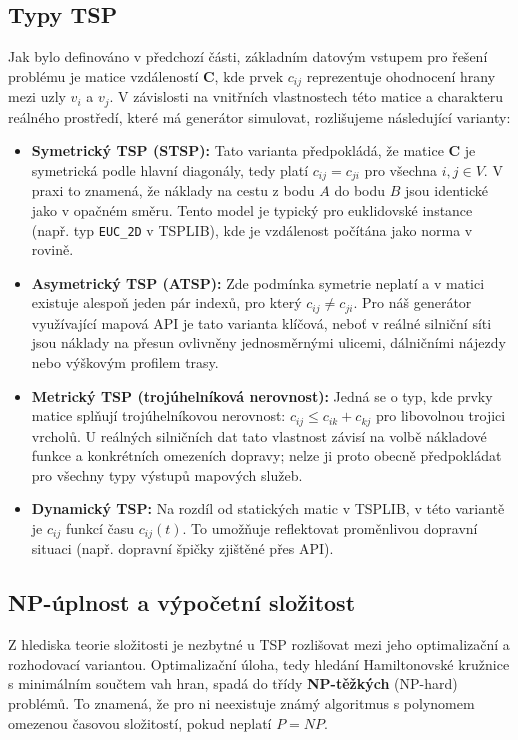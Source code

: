 \subsection{Typy TSP}
Jak bylo definováno v předchozí části, základním datovým vstupem pro řešení problému je matice vzdáleností $\mathbf{C}$, kde prvek $c_{ij}$ reprezentuje ohodnocení hrany mezi uzly $v_i$ a $v_j$. V závislosti na vnitřních vlastnostech této matice a charakteru reálného prostředí, které má generátor simulovat, rozlišujeme následující varianty:

\begin{itemize}
    \item \textbf{Symetrický TSP (STSP):} Tato varianta předpokládá, že matice $\mathbf{C}$ je symetrická podle hlavní diagonály, tedy platí $c_{ij} = c_{ji}$ pro všechna $i, j \in V$. V praxi to znamená, že náklady na cestu z bodu $A$ do bodu $B$ jsou identické jako v opačném směru. Tento model je typický pro euklidovské instance (např. typ \texttt{EUC\_2D} v TSPLIB), kde je vzdálenost počítána jako norma v rovině.
    
    \item \textbf{Asymetrický TSP (ATSP):} Zde podmínka symetrie neplatí a v matici existuje alespoň jeden pár indexů, pro který $c_{ij} \neq c_{ji}$. Pro náš generátor využívající mapová API je tato varianta klíčová, neboť v reálné silniční síti jsou náklady na přesun ovlivněny jednosměrnými ulicemi, dálničními nájezdy nebo výškovým profilem trasy.
    
    \item \textbf{Metrický TSP (trojúhelníková nerovnost):} Jedná se o typ, kde prvky matice splňují trojúhelníkovou nerovnost: $c_{ij} \leq c_{ik} + c_{kj}$ pro libovolnou trojici vrcholů. U reálných silničních dat tato vlastnost závisí na volbě nákladové funkce a konkrétních omezeních dopravy; nelze ji proto obecně předpokládat pro všechny typy výstupů mapových služeb.
    
    \item \textbf{Dynamický TSP:} Na rozdíl od statických matic v TSPLIB, v této variantě je $c_{ij}$ funkcí času $c_{ij}(t)$. To umožňuje reflektovat proměnlivou dopravní situaci (např. dopravní špičky zjištěné přes API).
\end{itemize}


\subsection{NP-úplnost a výpočetní složitost}
Z hlediska teorie složitosti je nezbytné u TSP rozlišovat mezi jeho optimalizační a rozhodovací variantou. Optimalizační úloha, tedy hledání Hamiltonovské kružnice s minimálním součtem vah hran, spadá do třídy \textbf{NP-těžkých} (NP-hard) problémů. To znamená, že pro ni neexistuje známý algoritmus s polynomem omezenou časovou složitostí, pokud neplatí $P = NP$.%


